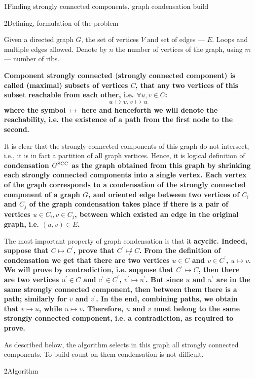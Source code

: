 \h1{Finding strongly connected components, graph condensation build}

\h2{Defining, formulation of the problem}

Given a directed graph $G$, the set of vertices $V$ and set of edges --- $E$. Loops and multiple edges allowed. Denote by $n$ the number of vertices of the graph, using $m$ --- number of ribs.

\bf{Component strongly connected} (strongly connected component) is called (maximal) subsets of vertices $C$, that any two vertices of this subset reachable from each other, i.e. $\forall u,v \in C$:
$$ u \mapsto v, v \mapsto u $$
where the symbol $\mapsto$ here and henceforth we will denote the reachability, i.e. the existence of a path from the first node to the second.

It is clear that the strongly connected components of this graph do not intersect, i.e., it is in fact a partition of all graph vertices. Hence, it is logical definition of \bf{condensation} $G^{\rm SCC}$ as the graph obtained from this graph by shrinking each strongly connected components into a single vertex. Each vertex of the graph corresponds to a condensation of the strongly connected component of a graph $G$, and oriented edge between two vertices of $C_i$ and $C_j$ of the graph condensation takes place if there is a pair of vertices $u \in C_i, v \in C_j$, between which existed an edge in the original graph, i.e. $(u,v) \in E$.

The most important property of graph condensation is that it \bf{acyclic}. Indeed, suppose that $C \mapsto C^\prime$, prove that $C^\prime \not\mapsto C$. From the definition of condensation we get that there are two vertices $u \in C$ and $v \in C^\prime$, $u \mapsto v$. We will prove by contradiction, i.e. suppose that $C^\prime \mapsto C$, then there are two vertices $u^\prime \in C$ and $v^\prime \in C^\prime$, $v^\prime \mapsto u^\prime$. But since $u$ and $u^\prime$ are in the same strongly connected component, then between them there is a path; similarly for $v$ and $v^\prime$. In the end, combining paths, we obtain that $v \mapsto u$, while $u \mapsto v$. Therefore, $u$ and $v$ must belong to the same strongly connected component, i.e. a contradiction, as required to prove.

As described below, the algorithm selects in this graph all strongly connected components. To build count on them condensation is not difficult.

\h2{Algorithm}

